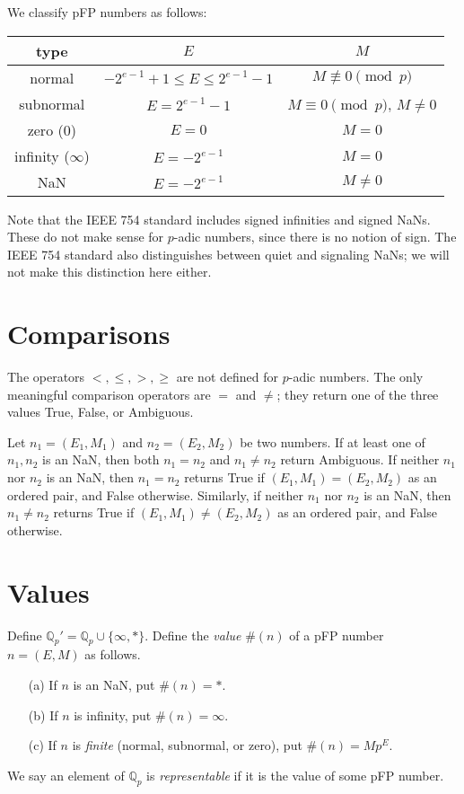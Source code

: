 \documentclass[12pt]{article}
\def\QQ{\mathbb{Q}}
\begin{document}
We classify pFP numbers as follows:
\begin{center}
\begin{tabular}{c|c|c} \\
type & $E$ & $M$ \\
\hline
normal & $-2^{e-1}+1 \leq E \leq 2^{e-1} - 1$ & $M \not\equiv 0 \pmod{p}$ \\
subnormal & $E = 2^{e-1} - 1$ & $M \equiv 0 \pmod{p}$, $M \neq 0$ \\
zero ($0$) & $E = 0$ & $M = 0$ \\
infinity ($\infty$) & $E = -2^{e-1}$ & $M = 0$ \\
NaN & $E = -2^{e-1}$ & $M \neq 0$
\end{tabular}
\end{center}
Note that the IEEE 754 standard includes signed infinities and signed NaNs.
These do not make sense for $p$-adic numbers, since there is no notion of
sign. The IEEE 754 standard also distinguishes between quiet and signaling
NaNs; we will not make this distinction here either.

\section{Comparisons}

The operators $<, \leq, >, \geq$ are not defined for $p$-adic numbers.
The only meaningful comparison operators are $=$ and $\neq$;
they return one of the three values True, False, or Ambiguous.

Let $n_1 = (E_1, M_1)$ and $n_2 = (E_2, M_2)$ be two numbers.
If at least one of $n_1, n_2$ is an NaN, then both 
$n_1 = n_2$ and $n_1 \neq n_2$ 
return Ambiguous. If neither $n_1$ nor $n_2$ is an NaN,
then $n_1 = n_2$ returns True
if $(E_1,M_1) = (E_2,M_2)$ as an ordered pair,
and False otherwise. Similarly, 
if neither $n_1$ nor $n_2$ is an NaN,
then $n_1 \neq n_2$ returns True if 
$(E_1,M_1) \neq (E_2,M_2)$ as an ordered pair,
and False otherwise.

\section{Values}

Define $\QQ_p' = \QQ_p\cup\{\infty, *\}$.
Define the \emph{value} $\#(n)$ of a pFP number $n = (E,M)$ 
as follows.
\begin{enumerate}
\item[(a)]
If $n$ is an NaN, put $\#(n) = *$.
\item[(b)]
If $n$ is infinity, put $\#(n) = \infty$.
\item[(c)]
If $n$ is \emph{finite} (normal, subnormal, or zero),
put $\#(n) = M p^E$.
\end{enumerate}
We say an element of $\QQ_p$ is \emph{representable} if it
is the value of some pFP number.
\end{document}
